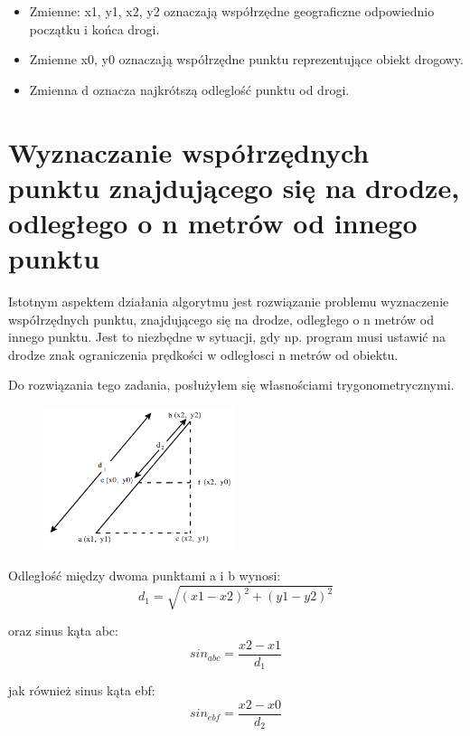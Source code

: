 \begin{itemize}
\item Zmienne: x1, y1, x2, y2 oznaczają współrzędne geograficzne odpowiednio początku i końca drogi.
\item Zmienne x0, y0 oznaczają współrzędne punktu reprezentujące obiekt drogowy.
\item Zmienna d oznacza najkrótszą odleglość punktu od drogi.
\end{itemize}


\newpage
\section{Wyznaczanie współrzędnych punktu znajdującego się na drodze, odległego o n metrów od innego punktu}
\label{sec:pointCoordinatesFromAnotherPoint}

Istotnym aspektem działania algorytmu jest rozwiązanie problemu wyznaczenie współrzędnych punktu, znajdującego się na drodze, odległego o n metrów od innego punktu.  Jest to niezbędne w sytuacji, gdy np. program musi ustawić na drodze znak ograniczenia prędkości w odległosci n metrów od obiektu.

Do rozwiązania tego zadania, posłużyłem się własnościami trygonometrycznymi.


\begin{figure}[h]
\centering
\includegraphics[width=0.5\textwidth]{distance}
\end{figure}

Odległość między dwoma punktami a i b wynosi:
\begin{equation}
d_1 = \sqrt{(x1 - x2)^2 + (y1 - y2)^2}
\end{equation}\newline

oraz sinus kąta abc:
\begin{equation}
sin_{abc} = \frac{x2 - x1}{d_1}
\end{equation}\newline

jak również sinus kąta ebf:
\begin{equation}
sin_{ebf} = \frac{x2 - x0}{d_2}
\end{equation}\newline

